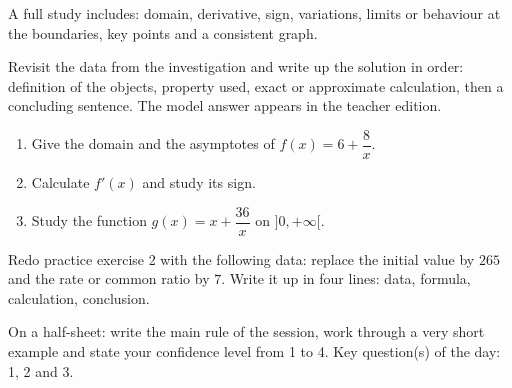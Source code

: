 \begin{traceecrite}A full study includes: domain, derivative, sign, variations, limits or behaviour at the boundaries, key points and a consistent graph.\end{traceecrite}

\begin{exemple}
Revisit the data from the investigation and write up the solution in order: definition of the objects, property used, exact or approximate calculation, then a concluding sentence. The model answer appears in the teacher edition.
\end{exemple}

\begin{exercice}[-- essential]
\begin{enumerate}\item Give the domain and the asymptotes of $f(x)=6+\dfrac{8}x$.\item Calculate $f'(x)$ and study its sign.\item Study the function $g(x)=x+\dfrac{36}x$ on $]0,+\infty[$.\end{enumerate}
\end{exercice}


\begin{dm}Redo practice exercise 2 with the following data: replace the initial value by $265$ and the rate or common ratio by $7$. Write it up in four lines: data, formula, calculation, conclusion.\end{dm}

\begin{sortie}On a half-sheet: write the main rule of the session, work through a very short example and state your confidence level from 1 to 4. Key question(s) of the day: 1, 2 and 3.\end{sortie}

